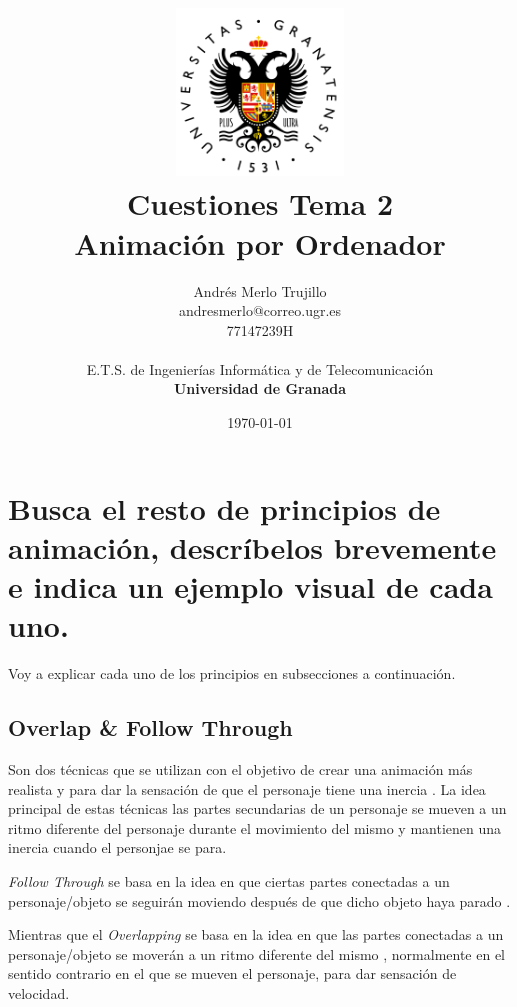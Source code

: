 \documentclass{article}
\title{
\includegraphics[width=1.75in]{imagenes/UGR-Logo.png} \\
\vspace*{1in}
\textbf{Cuestiones Tema 2} \\
Animación por Ordenador \\
\vspace*{0.5in}}
\author{Andrés Merlo Trujillo \\
andresmerlo@correo.ugr.es \\
77147239H \\ 
\vspace*{0.5in} \\
E.T.S. de Ingenierías Informática y de Telecomunicación \\
\textbf{Universidad de Granada}} \date{\today}
\begin{document}
\begin{titlingpage}
\maketitle
\end{titlingpage}

\tableofcontents

\newpage

\pagestyle{fancy}   %

\section{Busca el resto de principios de animación, descríbelos brevemente e indica un ejemplo visual de cada uno.}

Voy a explicar cada uno de los principios en subsecciones a continuación.

\subsection{Overlap \& Follow Through}

Son dos técnicas que se utilizan con el objetivo de crear una animación más realista y para dar la sensación de que el personaje tiene una inercia \cite{overlap}. La idea principal de estas técnicas las partes secundarias de un personaje se mueven a un ritmo diferente del personaje durante el movimiento del mismo y mantienen una inercia cuando el personjae se para.

\bigskip

\textit{Follow Through} se basa en la idea en que ciertas partes conectadas a un personaje/objeto se seguirán moviendo después de que dicho objeto haya parado \cite{overlap}.

\bigskip

Mientras que el \textit{Overlapping} se basa en la idea en que las partes conectadas a un personaje/objeto se moverán a un ritmo diferente del mismo \cite{overlap}, normalmente en el sentido contrario en el que se mueven el personaje, para dar sensación de velocidad.
\end{document}
